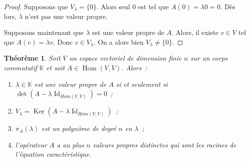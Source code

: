 \documentclass{article}
\DeclareMathOperator{\Id}{Id}
\DeclareMathOperator{\Ker}{Ker}
\DeclareMathOperator{\Hom}{Hom}
\newcommand{\K}{\mathbb K}
\newtheorem{thm}{Théorème}[section]
\theoremstyle{definition}
\theoremstyle{remark}
\begin{document}
		\begin{proof} Supposons que $V_\lambda = \{0\}$. Alors seul $0$ est tel que $A(0) = \lambda 0 = 0$. Dès lors, $\lambda$ n'est pas une valeur propre.

		Supposons maintenant que $\lambda$ est une valeur propre de $A$. Alors, il existe $v \in V$ tel que $A(v) = \lambda v$. Donc $v \in V_\lambda$. On
		a alors bien $V_\lambda \neq \{0\}$. \end{proof}

		\begin{thm} Soit $V$ un espace vectoriel de dimension finie $n$ sur un corps commutatif $\K$ et soit $A \in \Hom(V, V)$. Alors~:

		\begin{enumerate}
			\item $\lambda \in \K$ est une valeur propre de $A$ si et seulement si $\det(A - \lambda\Id_{Hom(V, V)}) = 0$~;
			\item $V_\lambda = \Ker(A - \lambda\Id_{Hom(V, V)})$~;
			\item $\pi_A(\lambda)$ est un polynôme de degré $n$ en $\lambda$~;
			\item l'opérateur $A$ a au plus $n$ valeurs propres distinctes qui sont les racines de l'équation caractéristique.
		\end{enumerate}
		\end{thm}
\end{document}
